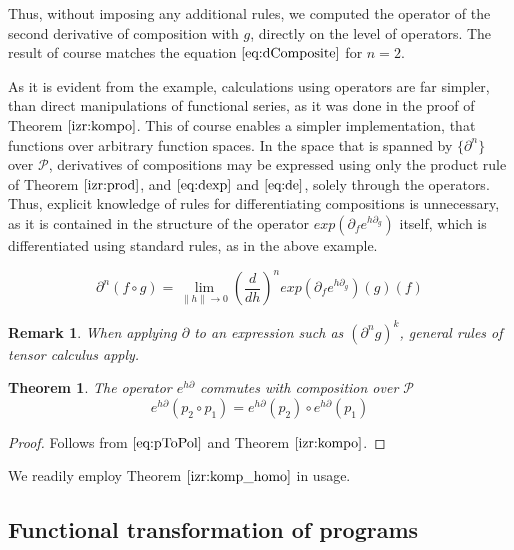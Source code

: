 \documentclass{article}
\newcommand{\dP}{\mathcal{P}}
\newcommand{\D}{\partial}
\newtheorem{izrek}{Theorem}[section]
\newtheorem{opomba}{Remark}[section]
\begin{document}
 Thus, without imposing any additional rules, we computed the operator of the second derivative of composition with $g$, directly on the level of operators. The result of course matches the equation $\eqref{eq:dComposite}$ for $n=2$.
 
 As it is evident from the example, calculations using operators are far simpler, than direct manipulations of functional series, as it was done in the proof of Theorem $\ref{izr:kompo}$. This of course enables a simpler implementation, that functions over arbitrary function spaces. In the space that is spanned by $\{\D^n\}$ over $\dP$, derivatives of compositions may be expressed using only the product rule of Theorem $\ref{izr:prod}$, and $\eqref{eq:dexp}$ and $\eqref{eq:de}$, solely through the operators. Thus, explicit knowledge of rules for differentiating compositions is unnecessary, as it is contained in the structure of the operator $exp(\D_fe^{h\D_g})$ itself, which is differentiated using standard rules, as in the above example.
 
 \begin{equation}\label{eq:dkompo}
 \D^n(f\circ g)=\lim\limits_{\lVert h\rVert\to 0}(\frac{d}{dh})^nexp(\D_fe^{h\D_g})(g)(f)
 \end{equation}
 
 \begin{opomba}
 When applying $\D$ to an expression such as $(\D^n g)^k$, general rules of tensor calculus apply. 
 \end{opomba}
 
   \begin{izrek}\label{izr:komp_homo}
   The operator $e^{h\D}$ commutes with composition over $\dP$
   \begin{equation}
   e^{h\D}(p_2\circ p_1)=e^{h\D}(p_2)\circ e^{h\D}(p_1)
   \end{equation}
   \end{izrek}
   
   \begin{proof}
   Follows from $\eqref{eq:pToPol}$ and Theorem $\ref{izr:kompo}$.
   \end{proof}
 We readily employ Theorem $\ref{izr:komp_homo}$ in usage.
 
   \subsection{Functional transformation of programs}\label{sec:FTP}
   
\end{document}

